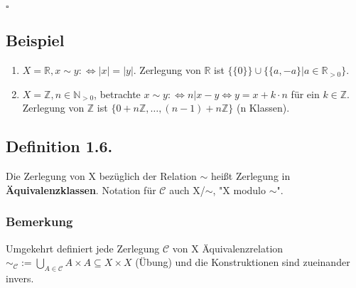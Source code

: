 \documentclass[a4paper, 12pt]{extarticle}
\begin{document}
\begin{flushleft}
$\square$\\
\end{flushleft}

\subsection*{Beispiel}
\begin{enumerate}[label=(\alph*)]
\item $X = \mathbb{R}, x \sim y :\Leftrightarrow |x| = |y|$.
Zerlegung von $\mathbb{R}$ ist $\{\{0\}\} \cup \{\{a, -a\} | a \in \mathbb{R}_{>0}\}$.
\item $X = \mathbb{Z}, n \in \mathbb{N}_{>0}$, betrachte $x \sim y :\Leftrightarrow n | x - y \Leftrightarrow y = x + k \cdot n$ für ein $k \in \mathbb{Z}$.
Zerlegung von $\mathbb{Z}$ ist $\{0 + n\mathbb{Z},\ldots, (n - 1) + n\mathbb{Z}\}$ (n Klassen).
\end{enumerate}

\subsection*{Definition 1.6.}
Die Zerlegung von X bezüglich der Relation $\sim$ heißt Zerlegung in \textbf{Äquivalenzklassen}. Notation für $\mathcal{C}$ auch X/$\sim$, "X modulo $\sim$".
\subsubsection*{Bemerkung}
Umgekehrt definiert jede Zerlegung $\mathcal{C}$ von X Äquivalenzrelation $\sim_\mathcal{C} := \bigcup_{A \in \mathcal{C}} A \times A \subseteq X \times X$ (Übung) und die Konstruktionen sind zueinander invers.
\end{document}
